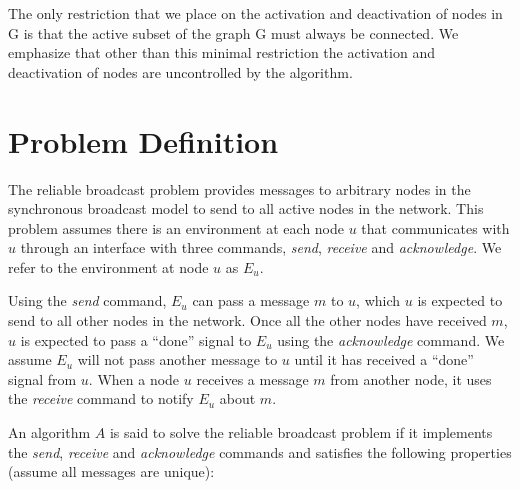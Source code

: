 \documentclass[english]{article}
\begin{document}
The only restriction that we place on the activation and deactivation of nodes in G is that the active subset of the graph G must always be connected. We emphasize that other than this minimal restriction the activation and deactivation of nodes are uncontrolled by the algorithm. 

\section{Problem Definition}

The reliable broadcast problem provides messages to arbitrary nodes in the synchronous broadcast model to send to all active nodes in the network. This problem assumes there is an environment at each node $u$ that communicates with $u$ through an  interface with three commands, \textit{send}, \textit{receive} and \textit{acknowledge}. We refer to the environment at node $u$ as $E_u$.

Using the \textit{send} command, $E_u$ can pass a message $m$ to $u$, which $u$ is expected to send to all other nodes in the network. Once all the other nodes have received $m$, $u$ is expected to pass a ``done'' signal to $E_u$ using the \textit{acknowledge} command. We assume $E_u$ will not pass another message to $u$ until it has received a ``done'' signal from $u$. 
When a node $u$ receives a message $m$ from another node, it uses the \textit{receive} command to notify $E_u$ about $m$.

An algorithm $A$ is said to solve the reliable broadcast problem if it implements the \textit{send}, \textit{receive} and \textit{acknowledge} commands and satisfies the following properties (assume all messages are unique):
\end{document}
